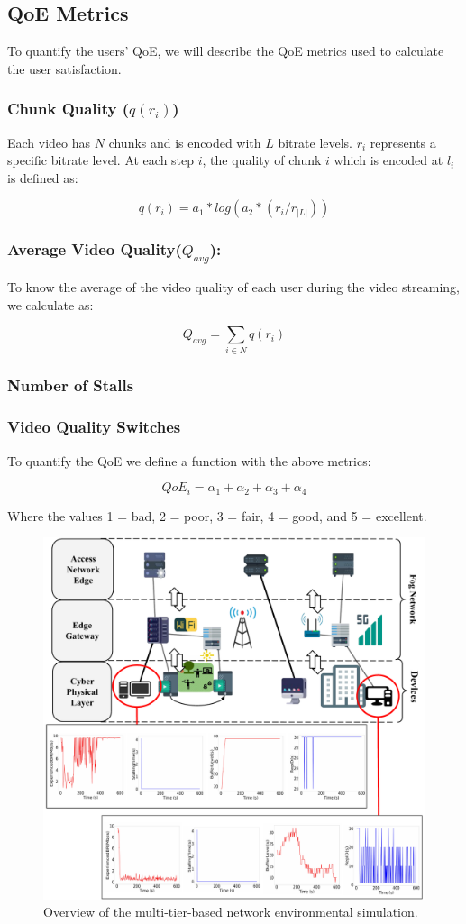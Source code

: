 \subsection{QoE Metrics}

To quantify the users' QoE, we will describe the QoE metrics used to calculate the user satisfaction. 

\subsubsection{Chunk Quality ($q(r_i)$)} Each video has $N$ chunks and is encoded with $L$ bitrate levels. $r_i$ represents a specific bitrate level. At each step $i$, the quality of chunk $i$ which is encoded at $l_i$ is defined as:

$$
q(r_i) = a_1 * log(a_2 * (r_i/ r_{|L|}))
$$


\subsubsection{Average Video Quality($Q_{avg}$):} To know the average of the video quality of each user during the video streaming, we calculate as:

$$
Q_{avg} = \sum_{i \in N} q(r_i)
$$

\subsubsection{Number of Stalls}

\subsubsection{Video Quality Switches}

To quantify the QoE we define a function with the above metrics:

$$
QoE_i = \alpha_1 + \alpha_2 + \alpha_3 + \alpha_4
$$

Where the values 1 = bad, 2 = poor, 3 = fair, 4 = good, and 5 = excellent.

\begin{figure}
    \centering
    \includegraphics[width=0.9\linewidth]{images/qoe-multi-level.pdf}
    \caption{Overview of the multi-tier-based  network environmental simulation.}
    \label{fig:impact-two-layers}
\end{figure}
